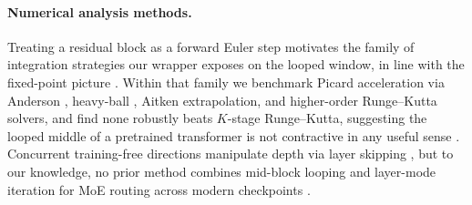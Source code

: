 \paragraph{Numerical analysis methods.}
Treating a residual block as a forward Euler step motivates the family of integration strategies our wrapper exposes on the looped window, in line with the fixed-point picture \citep{bai2019deep,bai2020multiscale}. Within that family we benchmark Picard acceleration via Anderson \citep{walker2011anderson}, heavy-ball \citep{polyak1964heavyball, ChenLLL24, ChenLL25, peng2026demo, LiaoYSZCL26, su2026the}, Aitken extrapolation, and higher-order Runge--Kutta solvers, and find none robustly beats $K$-stage Runge–Kutta, suggesting the looped middle of a pretrained transformer \citep{liu2024looped,saunshi2025reasoning,bae2025mor} is not contractive in any useful sense \citep{bai2019deep,belrose2023eliciting}. Concurrent training-free directions manipulate depth via layer skipping \citep{men2024short,lad2024remarkable}, but to our knowledge, no prior method combines mid-block looping and layer-mode iteration for MoE routing \citep{ChenLWLLLLL26} across modern checkpoints \citep{qwen3,llama3,deepseekv2,moonlight}.
